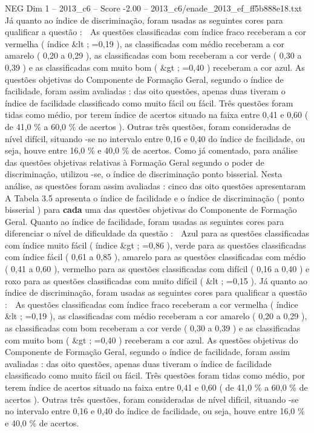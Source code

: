 \begin{textsample}{NEG Dim 1 – 2013\_c6 – Score -2.00 – 2013\_c6/enade\_2013\_ef\_ff5b888e18.txt}
Já quanto ao índice de discriminação, foram usadas as seguintes cores para qualificar a questão :  As questões classificadas com índice fraco receberam a cor vermelha ( índice \&lt ; =0,19 ), as classificadas com médio receberam a cor amarelo ( 0,20 a 0,29 ), as classificadas com bom receberam a cor verde ( 0,30 a 0,39 ) e as classificadas com muito bom ( \&gt ; =0,40 ) receberam a cor azul.
As questões objetivas do Componente de Formação Geral, segundo o índice de facilidade, foram assim avaliadas : das oito questões, apenas duas tiveram o índice de facilidade classificado como muito fácil ou fácil.
Três questões foram tidas como médio, por terem índice de acertos situado na faixa entre 0,41 e 0,60 ( de 41,0 \% a 60,0 \% de acertos ).
Outras três questões, foram consideradas de nível difícil, situando -se no intervalo entre 0,16 e 0,40 do índice de facilidade, ou seja, houve entre 16,0 \% e 40,0 \% de acertos.
Como já comentado, para análise das questões objetivas relativas à Formação Geral segundo o poder de discriminação, utilizou -se, o índice de discriminação ponto bisserial.
Nesta análise, as questões foram assim avaliadas : cinco das oito questões apresentaram A Tabela 3.5 apresenta o índice de facilidade e o índice de discriminação ( ponto bisserial ) para \textbf{cada} uma das questões objetivas do Componente de Formação Geral.
Quanto ao índice de facilidade, foram usadas as seguintes cores para diferenciar o nível de dificuldade da questão :  Azul para as questões classificadas com índice muito fácil ( índice \&gt ; =0,86 ), verde para as questões classificadas com índice fácil ( 0,61 a 0,85 ), amarelo para as questões classificadas com médio ( 0,41 a 0,60 ), vermelho para as questões classificadas com difícil ( 0,16 a 0,40 ) e roxo para as questões classificadas com muito difícil ( \&lt ; =0,15 ).
Já quanto ao índice de discriminação, foram usadas as seguintes cores para qualificar a questão :  As questões classificadas com índice fraco receberam a cor vermelha ( índice \&lt ; =0,19 ), as classificadas com médio receberam a cor amarelo ( 0,20 a 0,29 ), as classificadas com bom receberam a cor verde ( 0,30 a 0,39 ) e as classificadas com muito bom ( \&gt ; =0,40 ) receberam a cor azul.
As questões objetivas do Componente de Formação Geral, segundo o índice de facilidade, foram assim avaliadas : das oito questões, apenas duas tiveram o índice de facilidade classificado como muito fácil ou fácil.
Três questões foram tidas como médio, por terem índice de acertos situado na faixa entre 0,41 e 0,60 ( de 41,0 \% a 60,0 \% de acertos ).
Outras três questões, foram consideradas de nível difícil, situando -se no intervalo entre 0,16 e 0,40 do índice de facilidade, ou seja, houve entre 16,0 \% e 40,0 \% de acertos.

\end{textsample}
